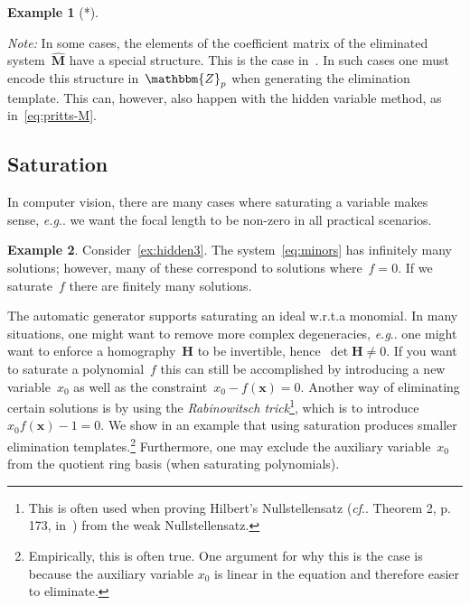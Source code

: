 \documentclass[11pt,a4paper]{article}
\makeatletter
\theoremstyle{definition}
\newtheorem{example}{Example}
\newcommand{\mat}[1]{\bm{#1}}
\newcommand{\Z}{\ensuremath{\mathbbm{Z}}}
\DeclareRobustCommand\eg{\emph{e.g}\@ifnextchar.{}{.\@}}
\DeclareRobustCommand\cf{\emph{cf}\@ifnextchar.{}{.\@}}
\makeatother
\begin{document}
\begin{example}[*]

\end{example}

\emph{Note:} In some cases, the elements of the coefficient matrix of the eliminated system~$\hat{\mat{M}}$ have a special structure.
This is the case in~\cite{kukelova-etal-cvpr-2015,valtonenoernhag-springer-2021}. In such cases
one must encode this structure in~$\Z_p$ when generating the elimination template.
This can, however, also happen with the hidden variable method, as in~\eqref{eq:pritts-M}.

\subsection{Saturation}
In computer vision, there are many cases where saturating a variable makes sense, \eg{}
we want the focal length to be non-zero in all practical scenarios.

\begin{example}
Consider~\cref{ex:hidden3}. The system~\eqref{eq:minors} has infinitely many solutions; however,
many of these correspond to solutions where~$f=0$. If we saturate~$f$ there are finitely many solutions.
\end{example}

The automatic generator supports saturating an ideal w.r.t.\@ a monomial. In many situations, one might
want to remove more complex degeneracies, \eg{} one might want to enforce a homography~$\mat{H}$
to be invertible, hence~$\det{\mat{H}}\neq 0$. If you want to saturate a polynomial~$f$ this
can still be accomplished by introducing a new
variable~$x_0$ as well as the constraint~$x_0-f(\mat{x}) = 0$.
Another way of eliminating certain solutions is by using the \emph{Rabinowitsch trick}\footnote{This
is often used when proving Hilbert's Nullstellensatz (\cf{} Theorem 2, p. 173, in~\cite{cox}) from the weak
Nullstellensatz.},
which is to introduce~$x_0f(\mat{x})-1 = 0$.
We show in an example that using saturation produces smaller elimination
templates.\footnote{Empirically, this is often true. One argument for why this is the case
is because the auxiliary variable $x_0$ is linear in the equation and therefore easier to eliminate.}
Furthermore, one may exclude the auxiliary variable~$x_0$ from the quotient ring basis
(when saturating polynomials).
\end{document}
